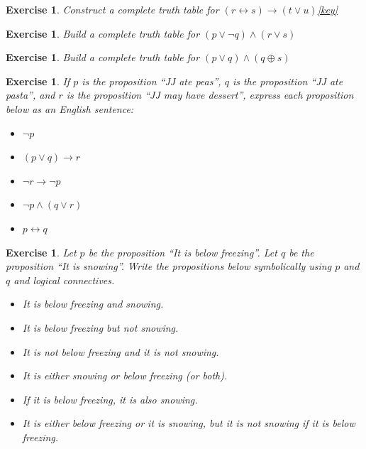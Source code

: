 \documentclass{book}
\newcounter{ekcounter}%
\theoremstyle{ekimcustom}
\newtheorem{exercise}[ekcounter]{Exercise}
\begin{document}
\begin{exercise}
Construct a complete truth table for $(r \leftrightarrow s) \rightarrow (t \vee u) $\quad\quad\href{https://www.sharelatex.com/project/59beca23c3ef170ecbecf73c}{{\color{red}[key]}}
\end{exercise}

\begin{exercise}
Build a complete truth table for $(p \vee \neg q) \wedge (r \vee s)$
\end{exercise}

\begin{exercise}
Build a complete truth table for $(p \vee q) \wedge (q \oplus s)$
\end{exercise}

\begin{exercise}
If $p$ is the proposition ``JJ ate peas'', $q$ is the proposition ``JJ ate pasta'', and $r$ is the proposition ``JJ may have dessert'', express each proposition below as an English sentence:
\begin{itemize}
\item $\neg p$
\item $(p \vee q) \rightarrow r$
\item $\neg r \rightarrow \neg p$
\item $\neg p \wedge (q \vee r)$
\item $p \leftrightarrow q$
\end{itemize}
\end{exercise}

\begin{exercise}
Let $p$ be the proposition ``It is below freezing''. Let $q$ be the proposition ``It is snowing''. Write the propositions below symbolically using $p$ and $q$ and logical connectives.
\begin{itemize}
\item It is below freezing and snowing.
\item It is below freezing but not snowing.
\item It is not below freezing and it is not snowing.
\item It is either snowing or below freezing (or both).
\item If it is below freezing, it is also snowing.
\item It is either below freezing or it is snowing, but it is not snowing if it is below freezing.
\end{itemize}
\end{exercise}
\end{document}
